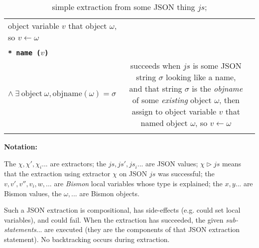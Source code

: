 \begin{table}
\begin{relsize}{-1.2}
\begin{center}
\begin{tabular}{lcp{5.7cm}}
      object variable $v$ that object $\omega$, so  $v \leftarrow \omega$ \\
            \rule{0pt}{1ex} \\
      \texttt{\textbf{* name ($v$)}} &
      \begin{minipage}[t]{4.5cm}
        $\mathit{js} \equiv \mathrm{some ~ JSON ~ string}~ \sigma$\\
        \hspace*{0.5em} $ \wedge ~ \exists ~ \mathrm{object} ~ \omega, \mathrm{objname}(\omega) = \sigma$ 
      \end{minipage}
      &
      succeeds when $\mathit{js}$ is some JSON string $\sigma$ looking like a name, and that string $\sigma$ is the \emph{objname} of some \emph{existing} object $\omega$, then assign to
      object variable $v$ that named object $\omega$, so  $v \leftarrow \omega$ \\
      \rule{0pt}{3ex} \\
    \end{tabular}
  \end{center}
  \bigskip
  \textbf{Notation:} \hspace{0.6em} \begin{minipage}{0.9\textwidth}
    The $\chi, \chi', \chi_i$... are extractors; the $\mathit{js},
    \mathit{js}', \mathit{js}_i$... are JSON values; $\chi
    \triangleright \mathit{js}$ means that the extraction using
    extractor $\chi$ on JSON $ \mathit{js}$ was successful; the $v,
    v', v'', v_i, w, $... are \emph{Bismon} local variables whose type
    is explained; the $x, y$... are Bismon values, the
    $\omega,$... are Bismon objects.
  \end{minipage}
  \end{relsize}
  \caption{simple extraction from some JSON thing $\mathit{js}$;
    {}
  }
  \label{tbl:extract-json-simple}
  \end{table}

Such a JSON extraction is compositional, has side-effects (e.g. could
set local variables), and could fail. When the extraction has
succeeded, the given \textit{sub-statements}... are executed (they are
the components of that JSON extraction statement). No backtracking
occurs during extraction.

